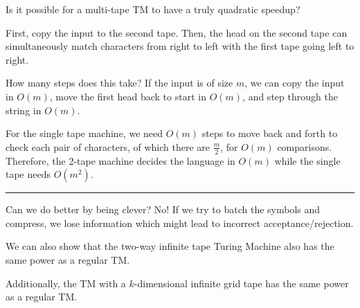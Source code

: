 \documentclass[twoside]{article}
\newenvironment{proof}{{\bf Proof:}}{\hfill\rule{2mm}{2mm}}
\begin{document}
Is it possible for a multi-tape TM to have a truly quadratic speedup?


\begin{proof}
	
	First, copy the input to the second tape.  Then, the head on the second tape can simultaneously match characters from right to left with the first tape going left to right.
	
	How many steps does this take?  If the input is of size $m$, we can copy the input in $O(m)$, move the first head back to start in $O(m)$, and step through the string in $O(m)$.
	
	For the single tape machine, we need $O(m)$ steps to move back and forth to check each pair of characters, of which there are $\frac{m}{2}$, for $O(m)$ comparisons.  Therefore, the 2-tape machine decides the language in $O(m)$ while the single tape needs $O(m^2)$.
	

	
\end{proof}

Can we do better by being clever?  No!  If we try to batch the symbols and compress, we lose information which might lead to incorrect acceptance/rejection.


We can also show that the two-way infinite tape Turing Machine also has the same power as a regular TM.

Additionally, the TM with a $k$-dimensional infinite grid tape has the same power as a regular TM.
\end{document}
